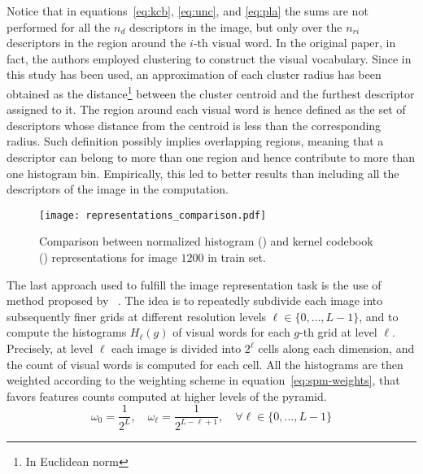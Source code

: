 \documentclass[../main.tex]{subfiles}
\begin{document}
Notice that in equations~\ref{eq:kcb}, \ref{eq:unc}, and \ref{eq:pla} the sums are not performed for all the
$n_{d}$ descriptors in the image, but only over the $n_{ri}$ descriptors in the
region around the $i$-th visual word. 
In the original paper, in fact, the authors employed  clustering to construct the visual vocabulary. 
Since in this study  has been used, an approximation of each
cluster radius has been obtained as the distance\footnote{In Euclidean
norm} between the cluster centroid and the furthest descriptor assigned to it. The
region around each visual word is hence defined as the set of descriptors whose
distance from the centroid is less than the corresponding radius. Such
definition possibly implies overlapping regions, meaning that a descriptor can
belong to more than one region and hence contribute to more than one histogram
bin. Empirically, this led to better
results than including all the descriptors of the image in the computation.

\begin{figure}[htb]
  \centering
  \texttt{[image: representations\_comparison.pdf]}
  \caption{Comparison between normalized histogram () and kernel
  codebook () representations for image $1200$ in train set.}\label{fig:hist-kcb-example}
\end{figure}


\pagebreak
The last approach used to fulfill the image representation task is the
use of  method proposed by ~\cite{lazebnik}. 
The idea is to repeatedly subdivide each image into
subsequently finer grids at different resolution levels $\ell \in
\{0,\dots,L-1\}$, and to compute the histograms $H_{\ell}(g)$ of visual words
for each $g$-th grid at level $\ell$. Precisely, at level $\ell$ each
image is divided into $2^{\ell}$ cells along each dimension, and the count of
visual words is computed for each cell.
All the histograms are then weighted according to the weighting
scheme in equation~\ref{eq:spm-weights},
that favors features counts computed at higher levels
of the pyramid. 
\begin{equation}\label{eq:spm-weights}
	\omega_0 = \frac{1}{2^{L}},
	\quad
	\omega_{\ell} = \frac{1}{2^{L-\ell+1}},
	\quad
	\forall \ell \in \{0, \ldots, L-1\}
\end{equation}
\end{document}
